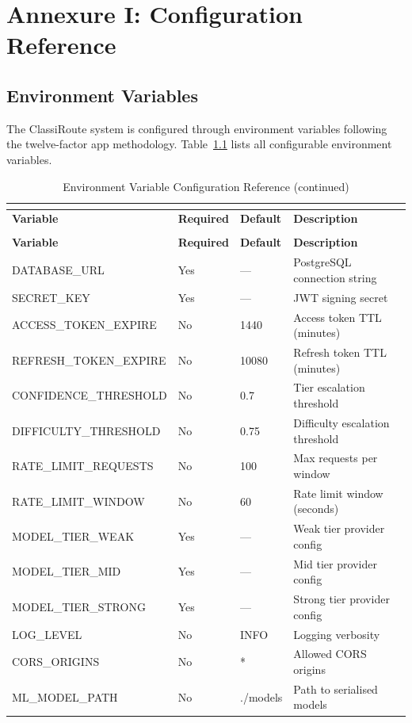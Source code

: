 \documentclass[oneside,12pt,a4paper]{report}
\begin{document}
\chapter{Annexure I: Configuration Reference}

\section{Environment Variables}

The ClassiRoute system is configured through environment variables following the twelve-factor app methodology. Table~\ref{tab:env_vars} lists all configurable environment variables.

\begin{longtable}{p{3.5cm}p{2.5cm}p{2.5cm}p{6cm}}
  \caption{Environment Variable Configuration Reference} \\
  \label{tab:env_vars} \\
  \toprule
  \textbf{Variable} & \textbf{Required} & \textbf{Default} & \textbf{Description} \\
  \midrule
  \endfirsthead
  \caption[]{Environment Variable Configuration Reference (continued)} \\
  \toprule
  \textbf{Variable} & \textbf{Required} & \textbf{Default} & \textbf{Description} \\
  \midrule
  \endhead
  \bottomrule
  \endfoot
  \endlastfoot
  
  DATABASE\_URL & Yes & --- & PostgreSQL connection string \\
  SECRET\_KEY & Yes & --- & JWT signing secret \\
  ACCESS\_TOKEN\_EXPIRE & No & 1440 & Access token TTL (minutes) \\
  REFRESH\_TOKEN\_EXPIRE & No & 10080 & Refresh token TTL (minutes) \\
  CONFIDENCE\_THRESHOLD & No & 0.7 & Tier escalation threshold \\
  DIFFICULTY\_THRESHOLD & No & 0.75 & Difficulty escalation threshold \\
  RATE\_LIMIT\_REQUESTS & No & 100 & Max requests per window \\
  RATE\_LIMIT\_WINDOW & No & 60 & Rate limit window (seconds) \\
  MODEL\_TIER\_WEAK & Yes & --- & Weak tier provider config \\
  MODEL\_TIER\_MID & Yes & --- & Mid tier provider config \\
  MODEL\_TIER\_STRONG & Yes & --- & Strong tier provider config \\
  LOG\_LEVEL & No & INFO & Logging verbosity \\
  CORS\_ORIGINS & No & * & Allowed CORS origins \\
  ML\_MODEL\_PATH & No & ./models & Path to serialised models \\
  
\end{longtable}
\end{document}
